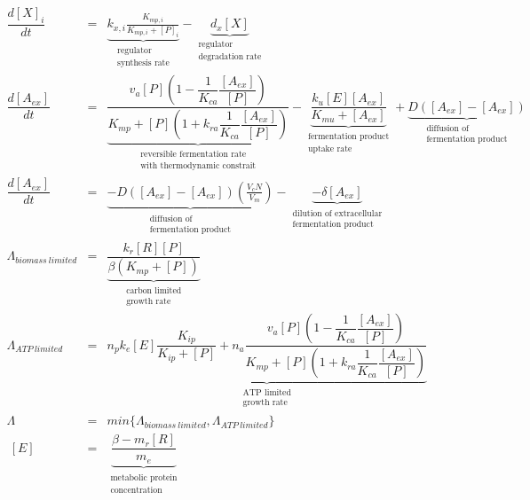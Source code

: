 \documentclass[11pt]{article}
\begin{document}
{\begin{eqnarray}
	\dfrac{d [X]_i}{d t} &=& \underbrace{k_{x,i}\frac{K_{mp,i}}{K_{mp,i}+[P]_i}}_{\substack{\text{regulator}\\\text{synthesis rate}}}-\underbrace{d_{x}[X]}_{\substack{\text{regulator}\\
 \text{degradation rate}}} ~\label{eq:dgdt_summary3}\\
	\dfrac{d [A_{ex}]}{d t} &=& \underbrace{\dfrac{v_a[P](1-\dfrac{1}{K_{ca}}\dfrac{[A_{ex}]}{[P]})}{K_{mp}+[P](1+k_{ra}\dfrac{1}{K_{ca}}\dfrac{[A_{ex}]}{[P]})}}_{\substack{\text{reversible fermentation rate} \\ \text{with thermodynamic constrait}}}-\underbrace{\dfrac{k_u[E][A_{ex}]}{K_{mu}+[A_{ex}]}}_{\substack{\text{fermentation product} \\ \text{uptake rate}}}+ \underbrace{D([A_{ex}]-[A_{ex}])}_{\substack{\text{diffusion of} \\ \text{fermentation product}}}\\
	\dfrac{d [A_{ex}]}{d t} &=& \underbrace{-D([A_{ex}]-[A_{ex}])(\frac{V_cN}{V_m})}_{\substack{\text{diffusion of} \\ \text{fermentation product}}} - \underbrace{-\delta [A_{ex}]}_{\substack{\text{dilution of extracellular} \\ \text{fermentation product}}}\\
	\Lambda_{biomass \  limited} &=& \underbrace{\dfrac{k_r[R][P]}{\beta(K_{mp}+[P])}}_{\substack{\text{carbon limited} \\ \text{growth rate}}} \label{eq:growth_rate_summary3}\\
	\Lambda_{ATP \  limited} &=& \underbrace{n_pk_e[E]\dfrac{K_{ip}}{K_{ip}+[P]}+n_a\dfrac{v_a[P](1-\dfrac{1}{K_{ca}}\dfrac{[A_{ex}]}{[P]})}{K_{mp}+[P](1+k_{ra}\dfrac{1}{K_{ca}}\dfrac{[A_{ex}]}{[P]})}}_{\substack{\text{ATP limited} \\ \text{growth rate}}} \label{eq:growth_rate_summary3}\\
	\Lambda &=& min\{\Lambda_{biomass \  limited}, \Lambda_{ATP \  limited}\} \\ 
   ~[E] &=& \underbrace{\dfrac{\beta-m_r[R]}{m_e}}_{\substack{\text{metabolic protein} \\ \text{concentration}}} \label{eq:metab_prot_conc3}
  \end{eqnarray}


}
\end{document}
